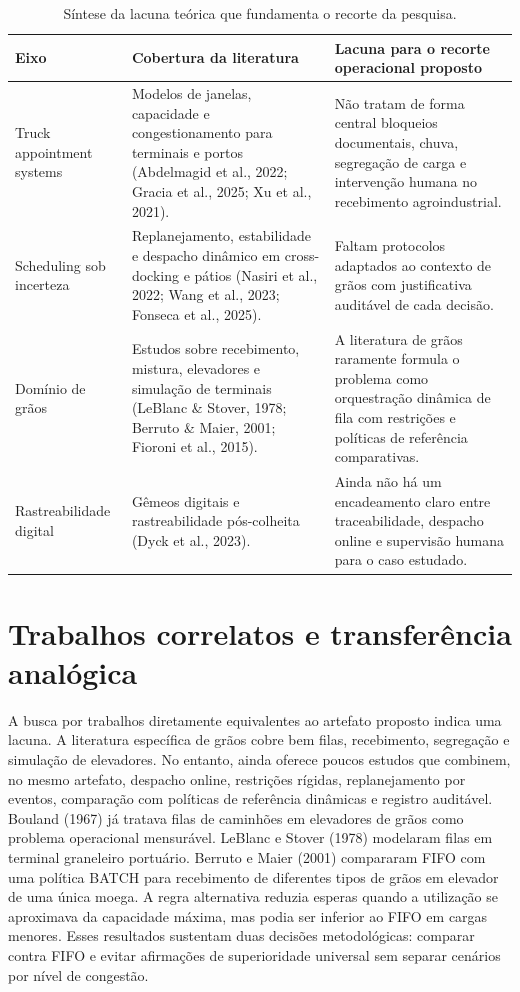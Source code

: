 \documentclass[
  12pt,
  oneside,
  a4paper,
  sumario=tradicional,
  brazil
]{abntex2}
\begin{document}
\begin{table}[H]
\centering
\small
\begin{tabular}{|P{0.18\textwidth}|P{0.34\textwidth}|P{0.34\textwidth}|}
\hline
\textbf{Eixo} & \textbf{Cobertura da literatura} & \textbf{Lacuna para o recorte operacional proposto} \\
\hline
Truck appointment systems & Modelos de janelas, capacidade e congestionamento para terminais e portos (Abdelmagid et al., 2022; Gracia et al., 2025; Xu et al., 2021). & N\~ao tratam de forma central bloqueios documentais, chuva, segrega\c{c}\~ao de carga e interven\c{c}\~ao humana no recebimento agroindustrial. \\
\hline
Scheduling sob incerteza & Replanejamento, estabilidade e despacho din\^amico em cross-docking e p\'atios (Nasiri et al., 2022; Wang et al., 2023; Fonseca et al., 2025). & Faltam protocolos adaptados ao contexto de gr\~aos com justificativa audit\'avel de cada decis\~ao. \\
\hline
Dom\'inio de gr\~aos & Estudos sobre recebimento, mistura, elevadores e simula\c{c}\~ao de terminais (LeBlanc \& Stover, 1978; Berruto \& Maier, 2001; Fioroni et al., 2015). & A literatura de gr\~aos raramente formula o problema como orquestra\c{c}\~ao din\^amica de fila com restri\c{c}\~oes e pol\'iticas de refer\^encia comparativas. \\
\hline
Rastreabilidade digital & G\^emeos digitais e rastreabilidade p\'os-colheita (Dyck et al., 2023). & Ainda n\~ao h\'a um encadeamento claro entre traceabilidade, despacho online e supervis\~ao humana para o caso estudado. \\
\hline
\end{tabular}
\caption{S\'intese da lacuna te\'orica que fundamenta o recorte da pesquisa.}
\end{table}

\section{Trabalhos correlatos e transfer\^encia anal\'ogica}
A busca por trabalhos diretamente equivalentes ao artefato proposto indica uma lacuna. A literatura espec\'ifica de gr\~aos cobre bem filas, recebimento, segrega\c{c}\~ao e simula\c{c}\~ao de elevadores. No entanto, ainda oferece poucos estudos que combinem, no mesmo artefato, despacho online, restri\c{c}\~oes r\'igidas, replanejamento por eventos, compara\c{c}\~ao com pol\'iticas de refer\^encia din\^amicas e registro audit\'avel. Bouland (1967) j\'a tratava filas de caminh\~oes em elevadores de gr\~aos como problema operacional mensur\'avel. LeBlanc e Stover (1978) modelaram filas em terminal graneleiro portu\'ario. Berruto e Maier (2001) compararam FIFO com uma pol\'itica BATCH para recebimento de diferentes tipos de gr\~aos em elevador de uma \'unica moega. A regra alternativa reduzia esperas quando a utiliza\c{c}\~ao se aproximava da capacidade m\'axima, mas podia ser inferior ao FIFO em cargas menores. Esses resultados sustentam duas decis\~oes metodol\'ogicas: comparar contra FIFO e evitar afirma\c{c}\~oes de superioridade universal sem separar cen\'arios por n\'ivel de congest\~ao.
\end{document}
